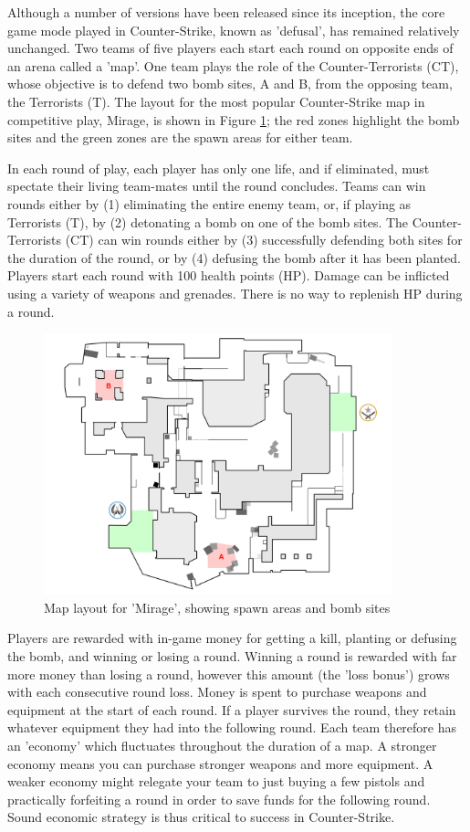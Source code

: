 Although a number of versions have been released since its inception, the core game mode played in Counter-Strike, known as 'defusal', has remained relatively unchanged. Two teams of five players each start each round on opposite ends of an arena called a 'map'. One team plays the role of the Counter-Terrorists (CT), whose objective is to defend two bomb sites, A and B, from the opposing team, the Terrorists (T). The layout for the most popular Counter-Strike map in competitive play, Mirage, is shown in Figure \ref{fig:mirage}; the red zones highlight the bomb sites and the green zones are the spawn areas for either team.

In each round of play, each player has only one life, and if eliminated, must spectate their living team-mates until the round concludes. Teams can win rounds either by (1) eliminating the entire enemy team, or, if playing as Terrorists (T), by (2) detonating a bomb on one of the bomb sites. The Counter-Terrorists (CT) can win rounds either by (3) successfully defending both sites for the duration of the round, or by (4) defusing the bomb after it has been planted. Players start each round with 100 health points (HP). Damage can be inflicted using a variety of weapons and grenades. There is no way to replenish HP during a round.

\begin{figure}[h]
	\centering
	\includegraphics[width=0.9\textwidth]{Figures/mirage.png}
	\caption{Map layout for 'Mirage', showing spawn areas and bomb sites}
	\label{fig:mirage}
\end{figure}

Players are rewarded with in-game money for getting a kill, planting or defusing the bomb, and winning or losing a round. Winning a round is rewarded with far more money than losing a round, however this amount (the 'loss bonus') grows with each consecutive round loss. Money is spent to purchase weapons and equipment at the start of each round. If a player survives the round, they retain whatever equipment they had into the following round. Each team therefore has an 'economy' which fluctuates throughout the duration of a map. A stronger economy means you can purchase stronger weapons and more equipment. A weaker economy might relegate your team to just buying a few pistols and practically forfeiting a round in order to save funds for the following round. Sound economic strategy is thus critical to success in Counter-Strike.

